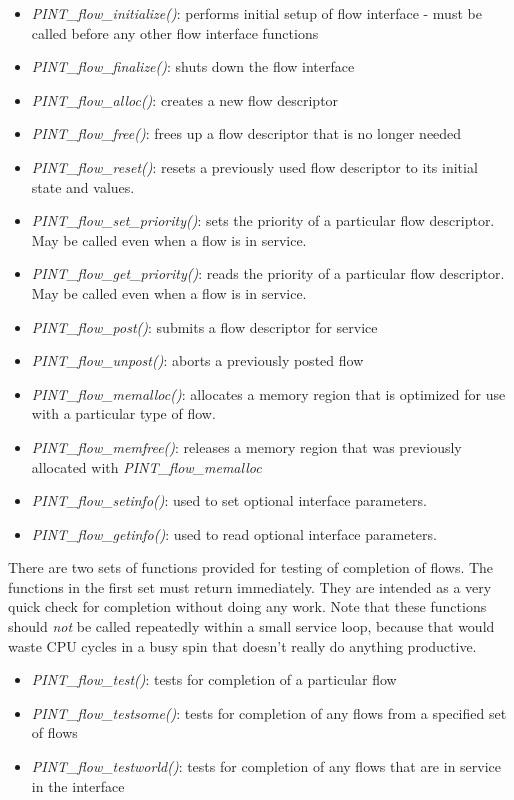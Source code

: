 \documentclass[12pt]{article} %
\begin{document}
\begin{itemize}
	\item \emph{PINT\_flow\_initialize()}: performs initial setup of flow
	interface - must be called before any other flow interface functions
	\item \emph{PINT\_flow\_finalize()}: shuts down the flow interface
	\item \emph{PINT\_flow\_alloc()}: creates a new flow descriptor
	\item \emph{PINT\_flow\_free()}: frees up a flow descriptor that is
	no longer needed
	\item \emph{PINT\_flow\_reset()}: resets a previously used flow
	descriptor to its initial state and values.
	\item \emph{PINT\_flow\_set\_priority()}: sets the priority of a
	particular flow descriptor.  May be called even when a flow is in
	service.
	\item \emph{PINT\_flow\_get\_priority()}: reads the priority of a
	particular flow descriptor.  May be called even when a flow is in
	service.
	\item \emph{PINT\_flow\_post()}: submits a flow descriptor for
	service
	\item \emph{PINT\_flow\_unpost()}: aborts a previously posted flow
	\item \emph{PINT\_flow\_memalloc()}: allocates a memory region that
	is optimized for use with a particular type of flow.
	\item \emph{PINT\_flow\_memfree()}: releases a memory region that was
	previously allocated with \emph{PINT\_flow\_memalloc}
	\item \emph{PINT\_flow\_setinfo()}: used to set optional
	interface parameters.
	\item \emph{PINT\_flow\_getinfo()}: used to read optional
	interface parameters.
\end{itemize}

There are two sets of functions provided for testing of completion of
flows.  The functions in the first set must return immediately.  They are
intended as a very quick check for completion without doing any work.
Note that these functions should \emph{not} be called repeatedly within
a small service loop, because that would waste CPU cycles in a busy spin
that doesn't really do anything productive.

\begin{itemize}
	\item \emph{PINT\_flow\_test()}: tests for completion of a particular
	flow
	\item \emph{PINT\_flow\_testsome()}: tests for completion of any
   flows from a specified set of flows
	\item \emph{PINT\_flow\_testworld()}: tests for completion of any
	flows that are in service in the interface 
\end{itemize}
\end{document}
